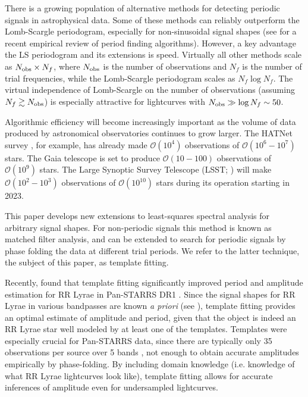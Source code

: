 \documentclass[apj]{emulateapj}
\newcommand{\bigO}{\mathcal{O}}
\begin{document}
There is a growing population of alternative methods for detecting
periodic signals in astrophysical data. Some of these methods can reliably
outperform the Lomb-Scargle periodogram, especially for non-sinusoidal signal shapes
(see \cite{Graham_etal_2013} for a recent empirical review of period finding algorithms). 
However, a key advantage the LS periodogram and its extensions is speed.
Virtually all other methods scale as $N_{\rm obs}\times N_f$, where $N_{\rm obs}$ is the number
of observations and $N_f$ is the number of trial frequencies, while the Lomb-Scargle
periodogram scales as $N_f\log N_f$. The virtual independence of Lomb-Scargle on the number
of observations (assuming $N_f \gtrsim N_{\rm obs}$) is especially attractive for lightcurves
with $N_{\rm obs} \gg \log N_f \sim 50$. 

Algorithmic efficiency will become increasingly important as the volume
of data produced by astronomical observatories continues to grow larger. The HATNet survey 
\citep{HATNet}, for example, has already made $\bigO(10^4)$ observations of 
$\bigO(10^6-10^7)$ stars. The Gaia telescope \citep{GAIA} is set to produce $\bigO(10-100)$ 
observations of $\bigO(10^9)$ stars. The Large Synoptic Survey Telescope (LSST; \cite{LSST}) 
will make $\bigO(10^2-10^3)$ observations of $\bigO(10^{10})$ stars during its operation starting in 2023.

This paper develops new extensions to least-squares spectral analysis for arbitrary
signal shapes. For non-periodic signals this method is known as matched filter analysis,
and can be extended to search for periodic signals by phase folding the data
at different trial periods. We refer to the latter technique, the subject of this paper, as
template fitting. 

Recently, \cite{Sesar_etal_2016} found that template fitting significantly improved
period and amplitude estimation for RR Lyrae in Pan-STARRS DR1 \citep{PanSTARRS}. Since the signal
shapes for RR Lyrae in various bandpasses are known \emph{a priori} (see \cite{Sesar_etal_2010}), 
template fitting provides an optimal estimate of amplitude and period,
given that the object is indeed an RR Lyrae star well modeled by at least one of the templates. 
Templates were especially crucial for Pan-STARRS data, since there are typically only 
35 observations per source over 5 bands \citep{Hernitschek_etal_2016}, not enough to obtain 
accurate amplitudes empirically by phase-folding. By including domain knowledge (i.e. knowledge of what RR Lyrae 
lightcurves look like), template fitting allows for accurate inferences of amplitude even 
for undersampled lightcurves.
\end{document}
